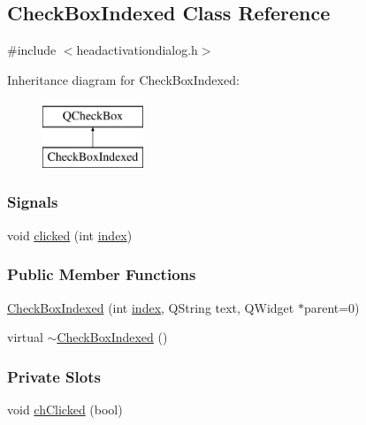 \hypertarget{classCheckBoxIndexed}{}\subsection{Check\+Box\+Indexed Class Reference}
\label{classCheckBoxIndexed}


{\ttfamily \#include $<$headactivationdialog.\+h$>$}

Inheritance diagram for Check\+Box\+Indexed\+:\begin{figure}[H]
\begin{center}
\leavevmode
\includegraphics[height=2.000000cm]{classCheckBoxIndexed}
\end{center}
\end{figure}
\subsubsection*{Signals}
\begin{DoxyCompactItemize}
\item 
void \mbox{\hyperlink{classCheckBoxIndexed_a47301b2594e820c3ecf73c83e2ed0838}{clicked}} (int \mbox{\hyperlink{classCheckBoxIndexed_a044019936afecec6b18af69da0bf7c41}{index}})
\end{DoxyCompactItemize}
\subsubsection*{Public Member Functions}
\begin{DoxyCompactItemize}
\item 
\mbox{\hyperlink{classCheckBoxIndexed_a05d9d0ecbdfd394db281bdcfe256fb46}{Check\+Box\+Indexed}} (int \mbox{\hyperlink{classCheckBoxIndexed_a044019936afecec6b18af69da0bf7c41}{index}}, Q\+String text, Q\+Widget $\ast$parent=0)
\item 
virtual \mbox{\hyperlink{classCheckBoxIndexed_a2966a555ec25ced314dcc10b54ca6c54}{$\sim$\+Check\+Box\+Indexed}} ()
\end{DoxyCompactItemize}
\subsubsection*{Private Slots}
\begin{DoxyCompactItemize}
\item 
void \mbox{\hyperlink{classCheckBoxIndexed_a103f5e490ee87326b823c6ccab56d83c}{ch\+Clicked}} (bool)
\end{DoxyCompactItemize}
